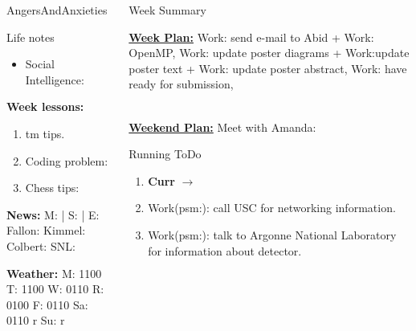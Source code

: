 \begin{columns}
\begin{column}{0.20\linewidth}
\begin{block}{AngersAndAnxieties}
\begin{itemize}
      \end{itemize}
    \end{block}
      \begin{block}{Life notes}
        \begin{itemize}
          \tiny \item \tiny Social Intelligence: 
        \end{itemize}
      \end{block}
      \begin{block}
        {\tiny {\bf Week lessons:}}
        \begin{enumerate}
        \item \tiny tm tips.
        \item \tiny Coding problem: 
        \item \tiny Chess tips: 
        \end{enumerate}
            {{\tiny {\tiny \bf  News:}} {\tiny  M:  | S: 
                | E: Fallon:  Kimmel:  Colbert: SNL:}}

            {{\tiny {\tiny \bf  Weather:}} {\tiny M: 1100 T: 1100 W:
                0110 R: 0100 F: 0110 Sa: 0110 r Su: r }}

             
      \end{block}
  \end{column}
  \begin{column}{0.6\linewidth}
    \begin{block}{Week Summary}
      {\underline {\bf Week Plan:} Work: send e-mail to Abid + Work:
        OpenMP, Work: update poster diagrams + Work:update poster text
     + Work: update poster abstract, Work: have ready for submission, 

} \\
      {\underline{\bf Weekend Plan:} Meet with Amanda: } \\
    \end{block}
      \begin{block}{Running ToDo} %
        \begin{enumerate} 
      
     \item \tiny \textbf{Curr} $\rightarrow$ 
     
       
     \item \tiny Work(psm:): call USC for networking information. 
     \item \tiny Work(psm:): talk to Argonne National Laboratory for
       information about detector. 
       

\end{enumerate}
\end{block}
\end{column}
\end{columns}
